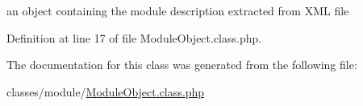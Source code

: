 an object containing the module description extracted from X\+M\+L file 



Definition at line 17 of file Module\+Object.\+class.\+php.



The documentation for this class was generated from the following file\+:\begin{DoxyCompactItemize}
\item 
classes/module/\hyperlink{ModuleObject_8class_8php}{Module\+Object.\+class.\+php}\end{DoxyCompactItemize}
